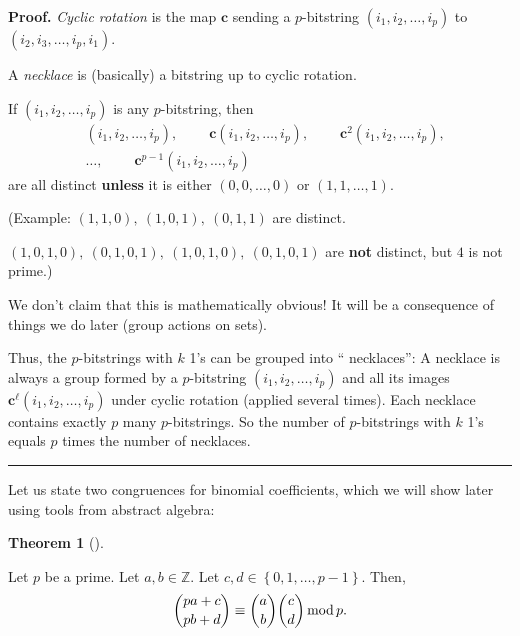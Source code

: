 \documentclass[numbers=enddot,12pt,final,onecolumn,notitlepage]{scrartcl}%
\numberwithin{exer}{subsection}
\theoremstyle{definition}
\newtheorem{theo}{Theorem}[subsection]
\newenvironment{theorem}[1][]
{\begin{theo}[#1]\begin{leftbar}}
{\end{leftbar}\end{theo}}
\newenvironment{proof}[1][Proof]{\noindent\textbf{#1.} }{\ \rule{0.5em}{0.5em}}
\newenvironment{noncompile}{}{}
\begin{document}
\begin{noncompile}
\begin{proof}
\textit{Cyclic rotation} is the map $\mathbf{c}$ sending a $p$-bitstring
$\left(  i_{1},i_{2},\ldots,i_{p}\right)  $ to $\left(  i_{2},i_{3}%
,\ldots,i_{p},i_{1}\right)  $.

A \textit{necklace} is (basically) a bitstring up to cyclic rotation.

If $\left(  i_{1},i_{2},\ldots,i_{p}\right)  $ is any $p$-bitstring, then
\begin{align*}
&  \left(  i_{1},i_{2},\ldots,i_{p}\right)  ,\ \ \ \ \ \ \ \ \ \ \mathbf{c}%
\left(  i_{1},i_{2},\ldots,i_{p}\right)  ,\ \ \ \ \ \ \ \ \ \ \mathbf{c}%
^{2}\left(  i_{1},i_{2},\ldots,i_{p}\right)  ,\\
&  \ldots,\ \ \ \ \ \ \ \ \ \ \mathbf{c}^{p-1}\left(  i_{1},i_{2},\ldots
,i_{p}\right)
\end{align*}
are all distinct \textbf{unless} it is either $\left(  0,0,\ldots,0\right)  $
or $\left(  1,1,\ldots,1\right)  $.

(Example: $\left(  1,1,0\right)  ,\ \left(  1,0,1\right)  ,\ \left(
0,1,1\right)  $ are distinct.

$\left(  1,0,1,0\right)  ,\ \left(  0,1,0,1\right)  ,\ \left(  1,0,1,0\right)
,\ \left(  0,1,0,1\right)  $ are \textbf{not} distinct, but $4$ is not prime.)

We don't claim that this is mathematically obvious! It will be a consequence
of things we do later (group actions on sets).

Thus, the $p$-bitstrings with $k$ 1's can be grouped into \textquotedblleft
necklaces\textquotedblright: A necklace is always a group formed by a
$p$-bitstring $\left(  i_{1},i_{2},\ldots,i_{p}\right)  $ and all its images
$\mathbf{c}^{\ell}\left(  i_{1},i_{2},\ldots,i_{p}\right)  $ under cyclic
rotation (applied several times). Each necklace contains exactly $p$ many
$p$-bitstrings. So the number of $p$-bitstrings with $k$ 1's equals $p$ times
the number of necklaces.
\end{proof}
\end{noncompile}

Let us state two congruences for binomial coefficients, which we will show
later using tools from abstract algebra:

\begin{theorem}
[Lucas's congruence]\label{thm.binom.lucas}Let $p$ be a prime. Let
$a,b\in\mathbb{Z}$. Let $c,d\in\left\{  0,1,\ldots,p-1\right\}  $. Then,%
\[
\dbinom{pa+c}{pb+d}\equiv\dbinom{a}{b}\dbinom{c}{d}\operatorname{mod}p.
\]

\end{theorem}
\end{document}
